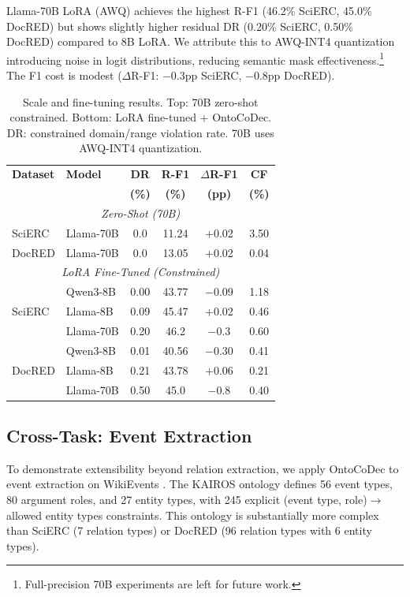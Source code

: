\documentclass[11pt]{article}
\begin{document}
Llama-70B LoRA (AWQ) achieves the highest R-F1 (46.2\% SciERC, 45.0\% DocRED) but shows slightly higher residual DR (0.20\% SciERC, 0.50\% DocRED) compared to 8B LoRA.
We attribute this to AWQ-INT4 quantization introducing noise in logit distributions, reducing semantic mask effectiveness.\footnote{Full-precision 70B experiments are left for future work.}
The F1 cost is modest ($\Delta$R-F1: $-0.3$pp SciERC, $-0.8$pp DocRED).

\begin{table}[t]
\centering
\small
\begin{tabular}{@{}llcccc@{}}
\toprule
\textbf{Dataset} & \textbf{Model} & \textbf{DR} & \textbf{R-F1} & \textbf{$\Delta$R-F1} & \textbf{CF} \\
& & \textbf{(\%)} & \textbf{(\%)} & \textbf{(pp)} & \textbf{(\%)} \\
\midrule
\multicolumn{6}{c}{\textit{Zero-Shot (70B)}} \\
\midrule
SciERC & Llama-70B & 0.0 & 11.24 & +0.02 & 3.50 \\
DocRED & Llama-70B & 0.0 & 13.05 & +0.02 & 0.04 \\
\midrule
\multicolumn{6}{c}{\textit{LoRA Fine-Tuned (Constrained)}} \\
\midrule
\multirow{3}{*}{SciERC}
& Qwen3-8B & 0.00 & 43.77 & $-$0.09 & 1.18 \\
& Llama-8B & 0.09 & 45.47 & +0.02 & 0.46 \\
& Llama-70B & 0.20 & 46.2 & $-$0.3 & 0.60 \\
\midrule
\multirow{3}{*}{DocRED}
& Qwen3-8B & 0.01 & 40.56 & $-$0.30 & 0.41 \\
& Llama-8B & 0.21 & 43.78 & +0.06 & 0.21 \\
& Llama-70B & 0.50 & 45.0 & $-$0.8 & 0.40 \\
\bottomrule
\end{tabular}
\caption{Scale and fine-tuning results. Top: 70B zero-shot constrained. Bottom: LoRA fine-tuned + OntoCoDec. DR: constrained domain/range violation rate. 70B uses AWQ-INT4 quantization.}
\label{tab:scale_ft}
\end{table}

\subsection{Cross-Task: Event Extraction}

To demonstrate extensibility beyond relation extraction, we apply OntoCoDec to event extraction on WikiEvents \cite{li2021document}.
The KAIROS ontology defines 56 event types, 80 argument roles, and 27 entity types, with 245 explicit (event type, role)$\to$allowed entity types constraints.
This ontology is substantially more complex than SciERC (7 relation types) or DocRED (96 relation types with 6 entity types).
\end{document}
